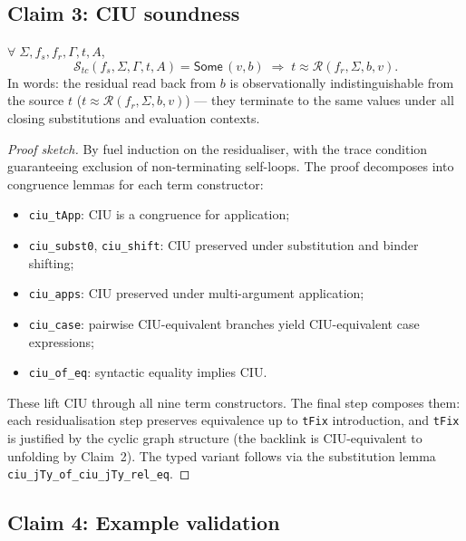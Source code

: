 \subsection{Claim 3: CIU soundness}

\begin{theorem}
\label{thm:ciu}
\noindent
$\forall\;\Sigma,f_s,f_r,\Gamma,t,A$,
\[
  \mathcal{S}_{\!\mathit{tc}}(f_s,\Sigma,\Gamma,t,A) = \mathsf{Some}\,(v,\mathit{b})
  \;\Longrightarrow\;
  t \approx \mathcal{R}(f_r,\Sigma,\mathit{b},v).
\]
In words: the residual read back from $\mathit{b}$ is observationally indistinguishable from the source $t$ ($t \approx \mathcal{R}(f_r,\Sigma,\mathit{b},v)$) --- they terminate to the same values under all closing substitutions and evaluation contexts.
\end{theorem}

\begin{proof}[Proof sketch]
By fuel induction on the residualiser, with the trace condition guaranteeing exclusion of non-terminating self-loops. The proof decomposes into congruence lemmas for each term constructor:
\begin{itemize}[leftmargin=*]
\item \texttt{ciu\_tApp}: CIU is a congruence for application;
\item \texttt{ciu\_subst0}, \texttt{ciu\_shift}: CIU preserved under substitution and binder shifting;
\item \texttt{ciu\_apps}: CIU preserved under multi-argument application;
\item \texttt{ciu\_case}: pairwise CIU-equivalent branches yield CIU-equivalent case expressions;
\item \texttt{ciu\_of\_eq}: syntactic equality implies CIU.
\end{itemize}
These lift CIU through all nine term constructors. The final step composes them: each residualisation step preserves equivalence up to \texttt{tFix} introduction, and \texttt{tFix} is justified by the cyclic graph structure (the backlink is CIU-equivalent to unfolding by Claim~2). The typed variant follows via the substitution lemma \texttt{ciu\_jTy\_of\_ciu\_jTy\_rel\_eq}.
\end{proof}

\subsection{Claim 4: Example validation}


